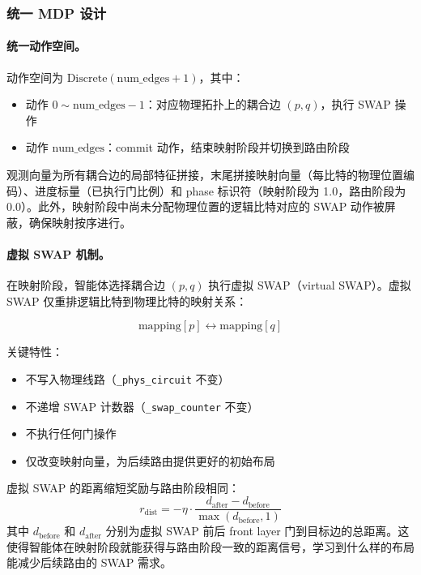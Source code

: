\subsubsection{统一 MDP 设计}

\paragraph{统一动作空间。} 动作空间为 $\text{Discrete}(\text{num\_edges} + 1)$，其中：
\begin{itemize}
  \item 动作 $0 \sim \text{num\_edges} - 1$：对应物理拓扑上的耦合边 $(p, q)$，执行 SWAP 操作
  \item 动作 $\text{num\_edges}$：commit 动作，结束映射阶段并切换到路由阶段
\end{itemize}

观测向量为所有耦合边的局部特征拼接，末尾拼接映射向量（每比特的物理位置编码）、进度标量（已执行门比例）和 phase 标识符（映射阶段为 1.0，路由阶段为 0.0）。此外，映射阶段中尚未分配物理位置的逻辑比特对应的 SWAP 动作被屏蔽，确保映射按序进行。

\paragraph{虚拟 SWAP 机制。} 在映射阶段，智能体选择耦合边 $(p, q)$ 执行虚拟 SWAP（virtual SWAP）。虚拟 SWAP 仅重排逻辑比特到物理比特的映射关系：

\[
\text{mapping}[p] \leftrightarrow \text{mapping}[q]
\]

关键特性：
\begin{itemize}
  \item 不写入物理线路（\texttt{\_phys\_circuit} 不变）
  \item 不递增 SWAP 计数器（\texttt{\_swap\_counter} 不变）
  \item 不执行任何门操作
  \item 仅改变映射向量，为后续路由提供更好的初始布局
\end{itemize}

虚拟 SWAP 的距离缩短奖励与路由阶段相同：
\[
r_{\text{dist}} = -\eta \cdot \frac{d_{\text{after}} - d_{\text{before}}}{\max(d_{\text{before}}, 1)}
\]
其中 $d_{\text{before}}$ 和 $d_{\text{after}}$ 分别为虚拟 SWAP 前后 front layer 门到目标边的总距离。这使得智能体在映射阶段就能获得与路由阶段一致的距离信号，学习到什么样的布局能减少后续路由的 SWAP 需求。


